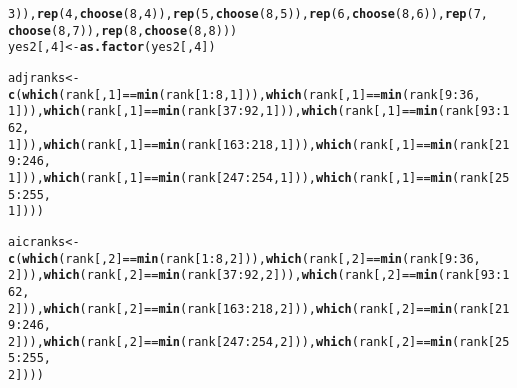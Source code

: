 \documentclass{article}\usepackage[]{graphicx}\usepackage[]{color}
\makeatletter
\newcommand{\hlnum}[1]{\textcolor[rgb]{0.686,0.059,0.569}{#1}}%
\newcommand{\hlopt}[1]{\textcolor[rgb]{0,0,0}{#1}}%
\newcommand{\hlstd}[1]{\textcolor[rgb]{0.345,0.345,0.345}{#1}}%
\newcommand{\hlkwb}[1]{\textcolor[rgb]{0.69,0.353,0.396}{#1}}%
\newcommand{\hlkwd}[1]{\textcolor[rgb]{0.737,0.353,0.396}{\textbf{#1}}}%
\newenvironment{kframe}{%
 \def\at@end@of@kframe{}%
 \ifinner\ifhmode%
  \def\at@end@of@kframe{\end{minipage}}%
  \begin{minipage}{\columnwidth}%
 \fi\fi%
 \def\FrameCommand##1{\hskip\@totalleftmargin \hskip-\fboxsep
 \colorbox{shadecolor}{##1}\hskip-\fboxsep
     \hskip-\linewidth \hskip-\@totalleftmargin \hskip\columnwidth}%
 \MakeFramed {\advance\hsize-\width
   \@totalleftmargin\z@ \linewidth\hsize
   \@setminipage}}%
 {\par\unskip\endMakeFramed%
 \at@end@of@kframe}
\newenvironment{knitrout}{}{} %
\makeatother
\begin{document}
\begin{knitrout}
\begin{kframe}
\begin{alltt}
    \hlnum{3}\hlstd{)),} \hlkwd{rep}\hlstd{(}\hlnum{4}\hlstd{,} \hlkwd{choose}\hlstd{(}\hlnum{8}\hlstd{,} \hlnum{4}\hlstd{)),} \hlkwd{rep}\hlstd{(}\hlnum{5}\hlstd{,} \hlkwd{choose}\hlstd{(}\hlnum{8}\hlstd{,} \hlnum{5}\hlstd{)),} \hlkwd{rep}\hlstd{(}\hlnum{6}\hlstd{,} \hlkwd{choose}\hlstd{(}\hlnum{8}\hlstd{,} \hlnum{6}\hlstd{)),} \hlkwd{rep}\hlstd{(}\hlnum{7}\hlstd{,}
    \hlkwd{choose}\hlstd{(}\hlnum{8}\hlstd{,} \hlnum{7}\hlstd{)),} \hlkwd{rep}\hlstd{(}\hlnum{8}\hlstd{,} \hlkwd{choose}\hlstd{(}\hlnum{8}\hlstd{,} \hlnum{8}\hlstd{)))}
\hlstd{yes2[,} \hlnum{4}\hlstd{]} \hlkwb{<-} \hlkwd{as.factor}\hlstd{(yes2[,} \hlnum{4}\hlstd{])}

\hlstd{adjranks} \hlkwb{<-} \hlkwd{c}\hlstd{(}\hlkwd{which}\hlstd{(rank[,} \hlnum{1}\hlstd{]} \hlopt{==} \hlkwd{min}\hlstd{(rank[}\hlnum{1}\hlopt{:}\hlnum{8}\hlstd{,} \hlnum{1}\hlstd{])),} \hlkwd{which}\hlstd{(rank[,} \hlnum{1}\hlstd{]} \hlopt{==} \hlkwd{min}\hlstd{(rank[}\hlnum{9}\hlopt{:}\hlnum{36}\hlstd{,}
    \hlnum{1}\hlstd{])),} \hlkwd{which}\hlstd{(rank[,} \hlnum{1}\hlstd{]} \hlopt{==} \hlkwd{min}\hlstd{(rank[}\hlnum{37}\hlopt{:}\hlnum{92}\hlstd{,} \hlnum{1}\hlstd{])),} \hlkwd{which}\hlstd{(rank[,} \hlnum{1}\hlstd{]} \hlopt{==} \hlkwd{min}\hlstd{(rank[}\hlnum{93}\hlopt{:}\hlnum{162}\hlstd{,}
    \hlnum{1}\hlstd{])),} \hlkwd{which}\hlstd{(rank[,} \hlnum{1}\hlstd{]} \hlopt{==} \hlkwd{min}\hlstd{(rank[}\hlnum{163}\hlopt{:}\hlnum{218}\hlstd{,} \hlnum{1}\hlstd{])),} \hlkwd{which}\hlstd{(rank[,} \hlnum{1}\hlstd{]} \hlopt{==} \hlkwd{min}\hlstd{(rank[}\hlnum{219}\hlopt{:}\hlnum{246}\hlstd{,}
    \hlnum{1}\hlstd{])),} \hlkwd{which}\hlstd{(rank[,} \hlnum{1}\hlstd{]} \hlopt{==} \hlkwd{min}\hlstd{(rank[}\hlnum{247}\hlopt{:}\hlnum{254}\hlstd{,} \hlnum{1}\hlstd{])),} \hlkwd{which}\hlstd{(rank[,} \hlnum{1}\hlstd{]} \hlopt{==} \hlkwd{min}\hlstd{(rank[}\hlnum{255}\hlopt{:}\hlnum{255}\hlstd{,}
    \hlnum{1}\hlstd{])))}

\hlstd{aicranks} \hlkwb{<-} \hlkwd{c}\hlstd{(}\hlkwd{which}\hlstd{(rank[,} \hlnum{2}\hlstd{]} \hlopt{==} \hlkwd{min}\hlstd{(rank[}\hlnum{1}\hlopt{:}\hlnum{8}\hlstd{,} \hlnum{2}\hlstd{])),} \hlkwd{which}\hlstd{(rank[,} \hlnum{2}\hlstd{]} \hlopt{==} \hlkwd{min}\hlstd{(rank[}\hlnum{9}\hlopt{:}\hlnum{36}\hlstd{,}
    \hlnum{2}\hlstd{])),} \hlkwd{which}\hlstd{(rank[,} \hlnum{2}\hlstd{]} \hlopt{==} \hlkwd{min}\hlstd{(rank[}\hlnum{37}\hlopt{:}\hlnum{92}\hlstd{,} \hlnum{2}\hlstd{])),} \hlkwd{which}\hlstd{(rank[,} \hlnum{2}\hlstd{]} \hlopt{==} \hlkwd{min}\hlstd{(rank[}\hlnum{93}\hlopt{:}\hlnum{162}\hlstd{,}
    \hlnum{2}\hlstd{])),} \hlkwd{which}\hlstd{(rank[,} \hlnum{2}\hlstd{]} \hlopt{==} \hlkwd{min}\hlstd{(rank[}\hlnum{163}\hlopt{:}\hlnum{218}\hlstd{,} \hlnum{2}\hlstd{])),} \hlkwd{which}\hlstd{(rank[,} \hlnum{2}\hlstd{]} \hlopt{==} \hlkwd{min}\hlstd{(rank[}\hlnum{219}\hlopt{:}\hlnum{246}\hlstd{,}
    \hlnum{2}\hlstd{])),} \hlkwd{which}\hlstd{(rank[,} \hlnum{2}\hlstd{]} \hlopt{==} \hlkwd{min}\hlstd{(rank[}\hlnum{247}\hlopt{:}\hlnum{254}\hlstd{,} \hlnum{2}\hlstd{])),} \hlkwd{which}\hlstd{(rank[,} \hlnum{2}\hlstd{]} \hlopt{==} \hlkwd{min}\hlstd{(rank[}\hlnum{255}\hlopt{:}\hlnum{255}\hlstd{,}
    \hlnum{2}\hlstd{])))}


\end{alltt}
\end{kframe}
\end{knitrout}
\end{document}
